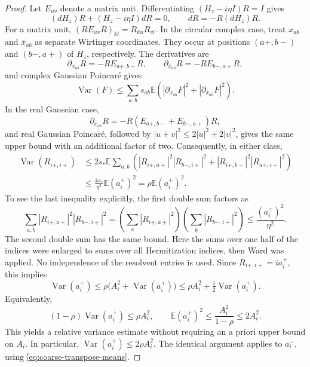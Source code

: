 \documentclass[11pt,reqno]{amsart}
\numberwithin{equation}{section}
\theoremstyle{plain}
\theoremstyle{definition}
\theoremstyle{remark}
\begin{document}
\begin{proof}
Let $E_{uv}$ denote a matrix unit. Differentiating
$(H_z-i\eta I)R=I$ gives
\[
 (dH_z)R+(H_z-i\eta I)dR=0,\qquad dR=-R(dH_z)R.
\]
For a matrix unit, $(RE_{uv}R)_{kl}=R_{ku}R_{vl}$.
In the circular complex case, treat $x_{ab}$ and $\overline{x}_{ab}$
as separate Wirtinger coordinates. They occur at positions $(a+,b-)$
and $(b-,a+)$ of $H_z$, respectively. The derivatives are
\begin{equation}\label{eq:coarse-complex-derivatives}
 \partial_{x_{ab}}R=-RE_{a+,b-}R,\qquad
 \partial_{\overline{x}_{ab}}R=-RE_{b-,a+}R,
\end{equation}
and complex Gaussian Poincar\'e gives
\[
 \operatorname{Var}(F)\le
 \sum_{a,b}s_{ab}\mathbb E\left(
 |\partial_{x_{ab}}F|^2+|\partial_{\overline{x}_{ab}}F|^2\right).
\]
In the real Gaussian case,
\begin{equation}\label{eq:coarse-real-derivative}
 \partial_{x_{ab}}R=-R(E_{a+,b-}+E_{b-,a+})R,
\end{equation}
and real Gaussian Poincar\'e, followed by
$|u+v|^2\le2|u|^2+2|v|^2$, gives the same upper bound with an additional
factor of two.  Consequently, in either class,
\begin{align*}
 \operatorname{Var}(R_{i+,i+})
 &\le2s_*\mathbb E\sum_{a,b}
 \left(|R_{i+,a+}|^2|R_{b-,i+}|^2
       +|R_{i+,b-}|^2|R_{a+,i+}|^2\right)\\
 &\le\frac{4s_*}{\eta^2}\mathbb E(a_i^+)^2
 =\rho\mathbb E(a_i^+)^2.
\end{align*}
To see the last inequality explicitly, the first double sum factors as
\[
 \sum_{a,b}|R_{i+,a+}|^2|R_{b-,i+}|^2
 =\left(\sum_a|R_{i+,a+}|^2\right)
  \left(\sum_b|R_{b-,i+}|^2\right)
 \le\frac{(a_i^+)^2}{\eta^2}.
\]
The second double sum has the same bound. Here the sums over one half
of the indices were enlarged to sums over all Hermitization indices,
then Ward was applied. No independence of the resolvent entries is used.
Since $R_{i+,i+}=ia_i^+$, this implies
\[
 \operatorname{Var}(a_i^+)
 \le\rho\bigl(A_i^2+\operatorname{Var}(a_i^+)\bigr)
 \le\rho A_i^2+\tfrac12\operatorname{Var}(a_i^+).
\]
Equivalently,
\[
 (1-\rho)\operatorname{Var}(a_i^+)\le\rho A_i^2,
 \qquad
 \mathbb E(a_i^+)^2\le\frac{A_i^2}{1-\rho}\le2A_i^2.
\]
This yields a relative variance estimate without requiring an a priori
upper bound on $A_i$. In particular, $\operatorname{Var}(a_i^+)\le2\rho A_i^2$.
The identical argument
applies to $a_i^-$, using \eqref{eq:coarse-transpose-means}.


\end{proof}
\end{document}
